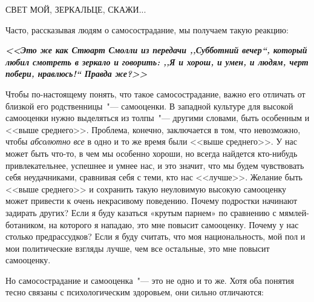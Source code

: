 \vspace{4ex}

\begin{center}
	{\Large СВЕТ МОЙ, ЗЕРКАЛЬЦЕ, СКАЖИ...}	
\end{center}

\vspace{2ex}

Часто, рассказывая людям о самосострадание, мы получаем такую реакцию:

\textbf{\textit{<<Это же как Стюарт Смолли из передачи ,,Субботний вечер``, который любил смотреть в зеркало и говорить: ,,Я и хорош, и умен, и людям, черт побери, нравлюсь!`` Правда же?>> }}

\vspace{2ex}

Чтобы по-настоящему понять, что такое самосострадание, важно его отличать от близкой его родственницы~"--- самооценки. В западной культуре для высокой самооценки нужно выделяться из толпы~"--- другими словами, быть особенным и <<выше среднего>>. Проблема, конечно, заключается в том, что невозможно, чтобы \emph{абсолютно все} в одно и то же время были <<выше среднего>>. У нас может быть что-то, в чем мы особенно хороши, но всегда найдется кто-нибудь привлекательнее, успешнее и умнее нас, и это значит, что мы будем чувствовать себя неудачниками, сравнивая себя с теми, кто нас <<лучше>>. Желание быть <<выше среднего>> и сохранить такую неуловимую высокую самооценку может привести к очень некрасивому поведению. Почему подростки начинают  задирать других? Если я буду казаться «крутым парнем» по сравнению с мямлей-ботаником, на которого я нападаю, это мне повысит самооценку. Почему у нас столько предрассудков? Если я буду считать, что моя национальность, мой пол и мои политические взгляды лучше, чем все остальные, это мне повысит самооценку.
   
Но самосострадание и самооценка~"--- это не одно и то же. Хотя оба понятия тесно связаны с психологическим здоровьем, они сильно отличаются:

